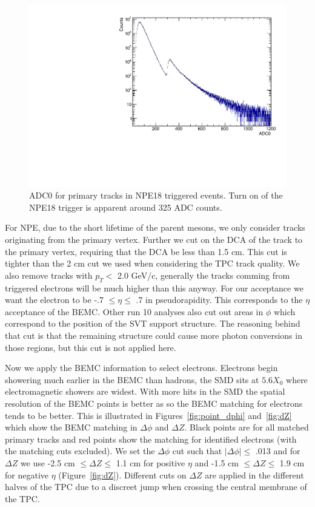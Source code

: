 \begin{figure}[htbp]
\begin{center}
\includegraphics[scale=.75]{Plots/NPE/ADC0_NPE18.pdf}
\end{center}
\caption[ADC0 Distribution for NPE18]{ADC0 for primary tracks in NPE18 triggered events. Turn on of the NPE18 trigger is apparent around 325 ADC counts.}
\label{fig:ADC0}
\end{figure}

For NPE, due to the short lifetime of the parent mesons, we only consider tracks originating from the primary vertex. Further we cut on the DCA of the track to the primary vertex, requiring that the DCA be less than 1.5 cm. This cut is tighter than the 2 cm cut we used when considering the TPC track quality. We also remove tracks with $p_T <$ 2.0 GeV/c, generally the tracks comming from triggered electrons will be much higher than this anyway. For our acceptance we want the electron to be -.7 $\leq \eta \leq$ .7 in  pseudorapidity. This corresponds to the $\eta$ acceptance of the BEMC. Other run 10 analyses also cut out areas in $\phi$ which correspond to the position of the SVT support structure. The reasoning behind that cut is that the remaining structure could cause more photon conversions in those regions, but this cut is not applied here.

Now we apply the BEMC information to select electrons. Electrons begin showering much earlier in the BEMC than hadrons, the SMD sits at $5.6 X_0$ where electromagnetic showers are widest. With more hits in the SMD the spatial resolution of the BEMC points is better as so the BEMC matching for electrons tends to be better. This is illustrated in Figures~\ref{fig:point_dphi} and~\ref{fig:dZ} which show the BEMC matching in $\Delta\phi$ and $\Delta Z$. Black points are for all matched primary tracks and red points show the matching for identified electrons (with the matching cuts excluded). We set the $\Delta\phi$ cut such that $|\Delta\phi| \leq$ .013 and for $\Delta Z$ we use -2.5 cm $\leq \Delta Z \leq$ 1.1 cm for positive $\eta$ and -1.5 cm $\leq \Delta Z \leq$ 1.9 cm for negative $\eta$ (Figure~\ref{fig:dZ}). Different cuts on $\Delta Z$ are applied in the different halves of the TPC due to a discreet jump when crossing the central membrane of the TPC.

